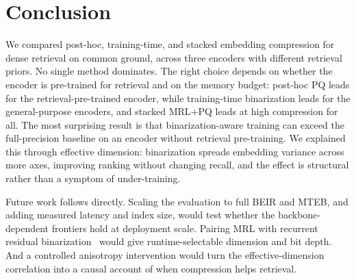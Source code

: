 \section{Conclusion}
\label{sec:conclusion}

We compared post-hoc, training-time, and stacked embedding compression for dense
retrieval on common ground, across three encoders with different retrieval
priors. No single method dominates. The right choice depends on whether the
encoder is pre-trained for retrieval and on the memory budget: post-hoc PQ leads
for the retrieval-pre-trained encoder, while training-time binarization leads for
the general-purpose encoders, and stacked MRL$+$PQ leads at high compression for
all. The most surprising result is that binarization-aware training can exceed
the full-precision baseline on an encoder without retrieval pre-training. We
explained this through effective dimension: binarization spreads embedding
variance across more axes, improving ranking without changing recall, and the
effect is structural rather than a symptom of under-training.

Future work follows directly. Scaling the evaluation to full BEIR and MTEB, and
adding measured latency and index size, would test whether the backbone-dependent
frontiers hold at deployment scale. Pairing MRL with recurrent residual
binarization~\citep{gan2023binary} would give runtime-selectable dimension and
bit depth. And a controlled anisotropy intervention would turn the
effective-dimension correlation into a causal account of when compression helps
retrieval.
